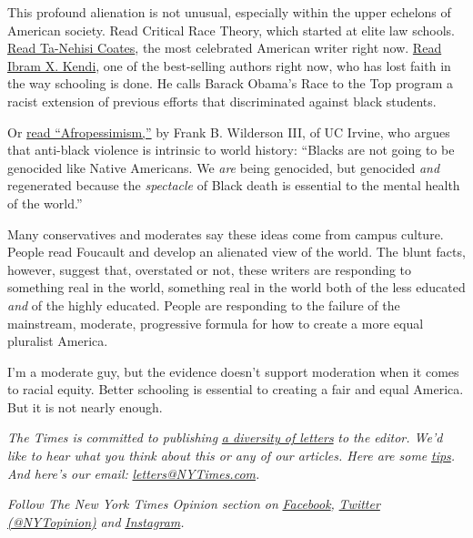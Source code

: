 This profound alienation is not unusual, especially within the upper
echelons of American society. Read Critical Race Theory, which started
at elite law schools. \href{https://ta-nehisicoates.com/books/}{Read
Ta-Nehisi Coates}, the most celebrated American writer right now.
\href{https://www.ibramxkendi.com/how-to-be-an-antiracist-1}{Read Ibram
X. Kendi}, one of the best-selling authors right now, who has lost faith
in the way schooling is done. He calls Barack Obama's Race to the Top
program a racist extension of previous efforts that discriminated
against black students.

Or \href{https://wwnorton.com/books/9781631496141}{read
``Afropessimism,''} by Frank B. Wilderson III, of UC Irvine, who argues
that anti-black violence is intrinsic to world history: ``Blacks are not
going to be genocided like Native Americans. We \emph{are} being
genocided, but genocided \emph{and} regenerated because the
\emph{spectacle} of Black death is essential to the mental health of the
world.''

Many conservatives and moderates say these ideas come from campus
culture. People read Foucault and develop an alienated view of the
world. The blunt facts, however, suggest that, overstated or not, these
writers are responding to something real in the world, something real in
the world both of the less educated \emph{and} of the highly educated.
People are responding to the failure of the mainstream, moderate,
progressive formula for how to create a more equal pluralist America.

I'm a moderate guy, but the evidence doesn't support moderation when it
comes to racial equity. Better schooling is essential to creating a fair
and equal America. But it is not nearly enough.

\emph{The Times is committed to publishing}
\href{https://www.nytimes3xbfgragh.onion/2019/01/31/opinion/letters/letters-to-editor-new-york-times-women.html}{\emph{a
diversity of letters}} \emph{to the editor. We'd like to hear what you
think about this or any of our articles. Here are some}
\href{https://help.nytimes3xbfgragh.onion/hc/en-us/articles/115014925288-How-to-submit-a-letter-to-the-editor}{\emph{tips}}\emph{.
And here's our email:}
\href{mailto:letters@NYTimes.com}{\emph{letters@NYTimes.com}}\emph{.}

\emph{Follow The New York Times Opinion section on}
\href{https://www.facebookcorewwwi.onion/nytopinion}{\emph{Facebook}}\emph{,}
\href{http://twitter.com/NYTOpinion}{\emph{Twitter (@NYTopinion)}}
\emph{and}
\href{https://www.instagram.com/nytopinion/}{\emph{Instagram}}\emph{.}

